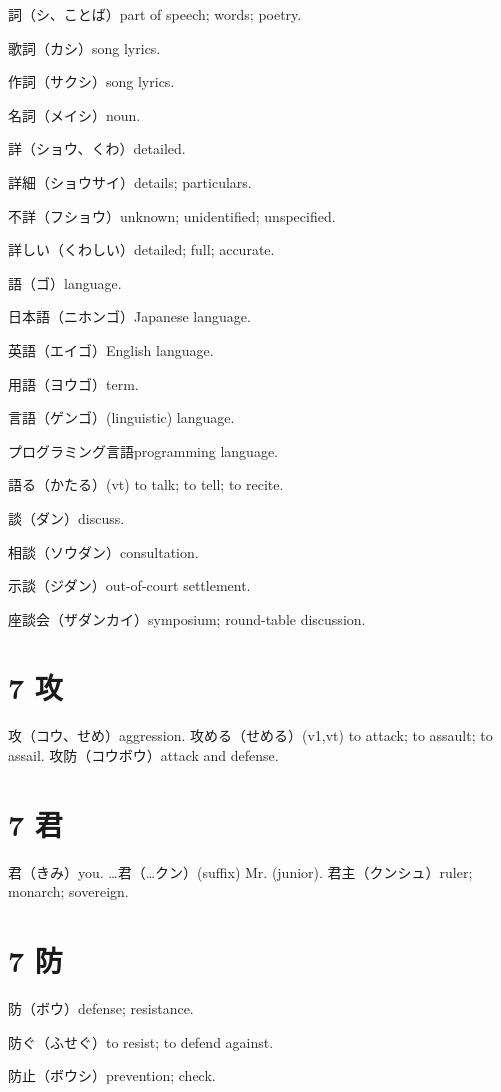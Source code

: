 詞（シ、ことば）part of speech; words; poetry.

歌詞（カシ）song lyrics.

作詞（サクシ）song lyrics.

名詞（メイシ）noun.

詳（ショウ、くわ）detailed.

詳細（ショウサイ）details; particulars.

不詳（フショウ）unknown; unidentified; unspecified.

詳しい（くわしい）detailed; full; accurate.

語（ゴ）language.

日本語（ニホンゴ）Japanese language.

英語（エイゴ）English language.

用語（ヨウゴ）term.

言語（ゲンゴ）(linguistic) language.

プログラミング言語programming language.

語る（かたる）(vt) to talk; to tell; to recite.

談（ダン）discuss.

相談（ソウダン）consultation.

示談（ジダン）out-of-court settlement.

座談会（ザダンカイ）symposium; round-table discussion.

\section{7 攻}

攻（コウ、せめ）aggression.
攻める（せめる）(v1,vt) to attack; to assault; to assail.
攻防（コウボウ）attack and defense.

\section{7 君}

君（きみ）you.
…君（…クン）(suffix) Mr. (junior).
君主（クンシュ）ruler; monarch; sovereign.

\section{7 防}

防（ボウ）defense; resistance.

防ぐ（ふせぐ）to resist; to defend against.

防止（ボウシ）prevention; check.

